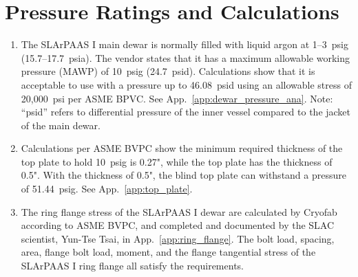 \section{Pressure Ratings and Calculations}
\label{sec:pressure_cal}

\begin{enumerate}
    \item The SLArPAAS I main dewar is normally filled with liquid argon at 
    1--3~psig (15.7--17.7~psia).
    The vendor states that it has a maximum allowable working pressure (MAWP) 
    of 10~psig (24.7~psid). 
    Calculations show that it is acceptable to use with a pressure up to
    46.08~psid using an allowable stress of 20,000~psi per ASME BPVC. 
    See App.~\ref{app:dewar_pressure_ana}. 
    Note: ``psid'' refers to differential pressure of the inner vessel compared 
    to the jacket of the main dewar.
    \item Calculations per ASME BVPC show the minimum required thickness of the top
    plate to hold 10~psig is 0.27", while the top plate has the thickness of 0.5".
    With the thickness of 0.5", the blind top plate can withstand a pressure of 51.44~psig.
    See App.~\ref{app:top_plate}.
    \item The ring flange stress of the SLArPAAS I dewar are calculated by Cryofab
    according to ASME BVPC, and completed and documented by the SLAC scientist, Yun-Tse Tsai,
    in App.~\ref{app:ring_flange}.  The bolt load, spacing, area, flange bolt load, moment,
    and the flange tangential stress of the SLArPAAS I ring flange all satisfy the requirements.
\end{enumerate}    
